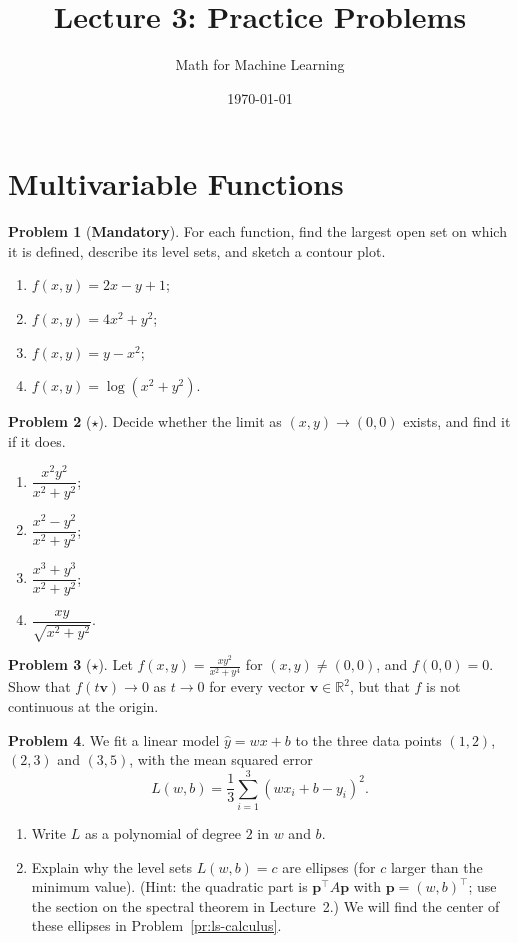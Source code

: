 \documentclass[11pt]{article}
\title{Lecture 3: Practice Problems}
\author{Math for Machine Learning}
\date{\today}
\theoremstyle{definition}
\newtheorem{problem}{Problem}[section]
\newcommand{\mandatory}{\textcolor{red!70!black}{\textbf{Mandatory}}}
\begin{document}
\maketitle

\section{Multivariable Functions}

\begin{problem}[\mandatory]\label{pr:level-sets}
    For each function, find the largest open set on which it is defined, describe its level sets, and sketch a contour plot.
    \begin{enumerate}[label=(\alph*)]
        \item $f(x, y) = 2x - y + 1$;
        \item $f(x, y) = 4x^2 + y^2$;
        \item $f(x, y) = y - x^2$;
        \item $f(x, y) = \log(x^2 + y^2)$.
    \end{enumerate}
\end{problem}

\begin{problem}[$\star$]\label{pr:limits}
    Decide whether the limit as $(x, y) \to (0, 0)$ exists, and find it if it does.
    \begin{enumerate}[label=(\alph*)]
        \item $\dfrac{x^2 y^2}{x^2 + y^2}$;
        \item $\dfrac{x^2 - y^2}{x^2 + y^2}$;
        \item $\dfrac{x^3 + y^3}{x^2 + y^2}$;
        \item $\dfrac{xy}{\sqrt{x^2 + y^2}}$.
    \end{enumerate}
\end{problem}

\begin{problem}[$\star$]\label{pr:lines-not-enough}
    Let $f(x, y) = \frac{xy^2}{x^2 + y^4}$ for $(x, y) \neq (0, 0)$, and $f(0, 0) = 0$. Show that $f(t\mathbf{v}) \to 0$ as $t \to 0$ for every vector $\mathbf{v} \in \mathbb{R}^2$, but that $f$ is not continuous at the origin.
\end{problem}

\begin{problem}\label{pr:mse-quadratic}
    We fit a linear model $\hat y = wx + b$ to the three data points $(1, 2)$, $(2, 3)$ and $(3, 5)$, with the mean squared error
    \[L(w, b) = \frac{1}{3}\sum_{i=1}^3 (wx_i + b - y_i)^2.\]
    \begin{enumerate}[label=(\alph*)]
        \item Write $L$ as a polynomial of degree $2$ in $w$ and $b$.
        \item Explain why the level sets $L(w, b) = c$ are ellipses (for $c$ larger than the minimum value). (Hint: the quadratic part is $\mathbf{p}^\top A\mathbf{p}$ with $\mathbf{p} = (w, b)^\top$; use the section on the spectral theorem in Lecture~2.) We will find the center of these ellipses in Problem~\ref{pr:ls-calculus}.
    \end{enumerate}
\end{problem}
\end{document}
